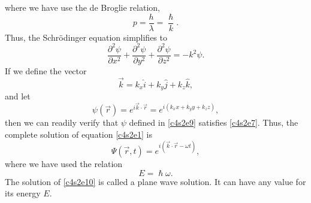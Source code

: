 where we have use the de Broglie relation,
\begin{equation}\label{c4s2e6}
p = \frac{h}{\lambda} = \frac{\hslash}{k}.
\end{equation}
Thus, the Schr\"{o}dinger equation simplifies to
\begin{equation}\label{c4s2e7}
\frac{\partial^2\psi}{\partial x^2} 
+ \frac{\partial^2\psi}{\partial y^2} + \frac{\partial^2\psi}{\partial z^2} =
-k^2\psi.
\end{equation}
If we define the vector
\begin{equation}\label{c4s2e8}
\vec{k} = k_x\hat{i} + k_y\hat{j} + k_z\hat{k},
\end{equation}
and let
\begin{equation}\label{c4s2e9}
\psi(\vec{r}) = e^{i\vec{k}\cdot\vec{r}} = e^{i(k_xx+k_yy+k_zz)},
\end{equation}
then we can readily verify that $\psi$ defined in \eqref{c4s2e9} satisfies
\eqref{c4s2e7}. Thus, the complete solution of equation \eqref{c4s2e1} is
\begin{equation}\label{c4s2e10}
\Psi(\vec{r}, t) = e^{i(\vec{k}\cdot\vec{r} - \omega t)},
\end{equation}
where we have used the relation
\begin{equation}\label{c4s2e11}
E = \hslash\omega.
\end{equation}
The solution of \eqref{c4s2e10} is called a plane wave solution. It can have 
any value for its energy $E$.

